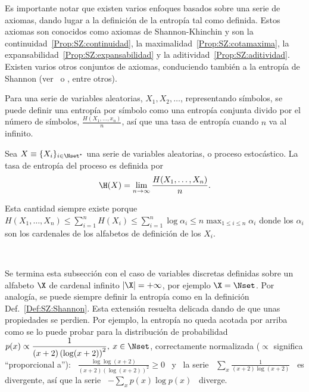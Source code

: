 Es  importante notar  que existen  varios enfoques  basados sobre  una  serie de
axiomas, dando lugar a la definici\'on de la entrop\'ia tal como definida. Estos
axiomas   son   conocidos   como   axiomas   de  Shannon-Khinchin   y   son   la
continuidad~\ref{Prop:SZ:continuidad},  la maximalidad~\ref{Prop:SZ:cotamaxima},
la           expansabilidad~\ref{Prop:SZ:expansabilidad}           y          la
aditividad~\ref{Prop:SZ:aditividad}.  Existen varios otros conjuntos de axiomas,
conduciendo  tambi\'en a  la entrop\'ia  de Shannon  (ver~\cite[Sec.~6]{Sha48} o
\cite{ShaWea64, Fad56, Fad58, Khi57, Ren61}, entre otros).

Para  una  serie de  variables  aleatorias,  $X_1,  X_2, \ldots$,  representando
s\'imbolos, se  puede definir una  entrop\'ia por s\'imbolo como  una entrop\'ia
conjunta  divido por el  n\'umero de  s\'imbolos, $\frac{H(X_1,\ldots,x_n)}{n}$,
as\'i que una tasa de entrop\'ia cuando $n$ va al infinito.
%
\begin{definicion}
\label{Def:SZ:TasaDeEntropia}
%
  Sea $X \equiv \{ X_i \}_{i  \in \Nset^*}$ una serie de variables aleatorias, o
  proceso estoc\'astico.  La tasa de entrop\'ia del proceso es definida por
  \[
  \H(X) = \lim_{n \to \infty} \frac{H(X_1,\ldots,X_n)}{n}.
  \]
\end{definicion}
%
\noindent Esta  cantidad siempre existe  porque $\displaystyle H(X_1 ,  \ldots ,
X_n) \le \sum_{i=1}^n H(X_i) \le \sum_{i=1}^n  \log \alpha_i \le n \max_{1 \le i
  \le n} \alpha_i$  donde los $\alpha_i$ son los cardenales  de los alfabetos de
definici\'on de los $X_i$.

\

Se termina esta subsecci\'on con el caso de variables discretas definidas sobre
un  alfabeto $\X$ de  cardenal infinito  $|\X| =  + \infty$,  por ejemplo  $\X =
\Nset$.   Por analog\'ia,  se puede  siempre definir  la entrop\'ia  como  en la
definici\'on Def.~\ref{Def:SZ:Shannon}. Esta extensi\'on resuelta delicada dando
de que unas propiedades se perdien.  Por ejemplo, la entrop\'ia no queda acotada
por arriba  como se  lo puede  probar para la  distribuci\'on de  probabilidad \
$\displaystyle p(x)  \propto \frac{1}{(x+2) \left(  \log (x+2) \right)^2},  \: x
\in \Nset$, correctamente  normalizada ($\propto$ significa ``proporcional a''):
\ $\displaystyle \frac{\log \log(x+2)}{(x+2) \left( \log (x+2) \right)^2} \ge 0$
\  y  \ la  serie  \  $\displaystyle \sum_x  \frac{1}{(x+2)  \log  (x+2)}$ \  es
divergente,  as\'i que  la serie  \ $\displaystyle  - \sum_x  p(x) \log  p(x)$ \
diverge.

